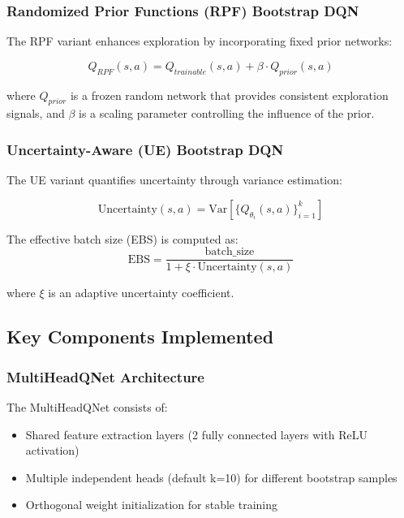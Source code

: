 \documentclass[12pt]{article}
\begin{document}
{{{\subsubsection{Randomized Prior Functions (RPF) Bootstrap DQN}
The RPF variant enhances exploration by incorporating fixed prior networks:

\begin{equation}
Q_{RPF}(s,a) = Q_{trainable}(s,a) + \beta \cdot Q_{prior}(s,a)
\end{equation}

where $Q_{prior}$ is a frozen random network that provides consistent exploration signals, and $\beta$ is a scaling parameter controlling the influence of the prior.

\subsubsection{Uncertainty-Aware (UE) Bootstrap DQN}
The UE variant quantifies uncertainty through variance estimation:

\begin{equation}
\text{Uncertainty}(s,a) = \text{Var}\left[\{Q_{\theta_i}(s,a)\}_{i=1}^k\right]
\end{equation}

The effective batch size (EBS) is computed as:
\begin{equation}
\text{EBS} = \frac{\text{batch\_size}}{1 + \xi \cdot \text{Uncertainty}(s,a)}
\end{equation}

where $\xi$ is an adaptive uncertainty coefficient.

\subsection{Key Components Implemented}

\subsubsection{MultiHeadQNet Architecture}
The MultiHeadQNet consists of:
\begin{itemize}
    \item Shared feature extraction layers (2 fully connected layers with ReLU activation)
    \item Multiple independent heads (default k=10) for different bootstrap samples
    \item Orthogonal weight initialization for stable training
\end{itemize}

}}}
\end{document}
